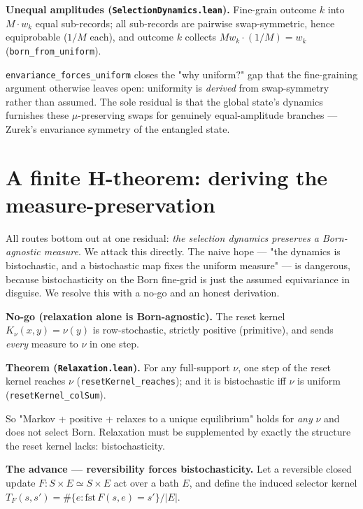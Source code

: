 \documentclass[11pt,a4paper]{article}
\newenvironment{qiqtquote}{\begin{mdframed}[style=quotestyle]}{\end{mdframed}}
\begin{document}
\begin{qiqtquote}
\textbf{Unequal amplitudes (\texttt{SelectionDynamics.lean}).} Fine-grain outcome $k$ into $M\cdot w_k$ equal
sub-records; all sub-records are pairwise swap-symmetric, hence equiprobable ($1/M$ each), and outcome $k$
collects $M w_k\cdot(1/M)=w_k$ (\texttt{born\_from\_uniform}).
\end{qiqtquote}

\texttt{envariance\_forces\_uniform} closes the "why uniform?" gap that the fine-graining argument otherwise leaves
open: uniformity is \emph{derived} from swap-symmetry rather than assumed. The sole residual is that the global
state's dynamics furnishes these $\mu$-preserving swaps for genuinely equal-amplitude branches — Zurek's
envariance symmetry of the entangled state.

\section{A finite H-theorem: deriving the measure-preservation}

All routes bottom out at one residual: \emph{the selection dynamics preserves a Born-agnostic measure}. We attack
this directly. The naive hope — "the dynamics is bistochastic, and a bistochastic map fixes the uniform
measure" — is dangerous, because bistochasticity on the Born fine-grid is just the assumed equivariance in
disguise. We resolve this with a no-go and an honest derivation.

\textbf{No-go (relaxation alone is Born-agnostic).} The reset kernel $K_\nu(x,y)=\nu(y)$ is row-stochastic,
strictly positive (primitive), and sends \emph{every} measure to $\nu$ in one step.

\begin{qiqtquote}
\textbf{Theorem (\texttt{Relaxation.lean}).} For any full-support $\nu$, one step of the reset kernel reaches $\nu$
(\texttt{resetKernel\_reaches}); and it is bistochastic iff $\nu$ is uniform (\texttt{resetKernel\_colSum}).
\end{qiqtquote}

So "Markov + positive + relaxes to a unique equilibrium" holds for \emph{any} $\nu$ and does not select Born.
Relaxation must be supplemented by exactly the structure the reset kernel lacks: bistochasticity.

\textbf{The advance — reversibility forces bistochasticity.} Let a reversible closed update $F:S\times E\simeq S\times E$ act over a bath $E$, and define the induced selector kernel $T_F(s,s')=\#\{e:\mathrm{fst}\,F(s,e)=s'\}/\lvert E\rvert$.
\end{document}
